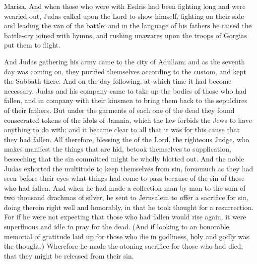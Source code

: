 { Marisa.
And when those who were with Esdris had been fighting long and were wearied out, Judas called upon the Lord to show himself, fighting on their side and leading the van of the battle;
and
{} in the language of his fathers he raised the battle-cry joined with hymns, and rushing unawares upon the troops of Gorgias put them to flight.
\par }{\PP {}And Judas gathering his army came to the city of
 Adullam; and as the seventh day was coming on, they purified themselves according to the custom, and kept the Sabbath there.
And on the day following,
 at which time it had become necessary, Judas and his company came to take up the bodies of those who had fallen,
 and in company with their kinsmen to bring them back to the sepulchres of their fathers.
But under the garments of each one of the dead they found
 consecrated tokens of the idols of Jamnia, which the law forbids the Jews to have anything to do with; and it became clear to all that it was for this cause that they had fallen.
All therefore, blessing the
{} of the Lord, the righteous Judge, who makes manifest the things that are hid,
betook themselves to supplication, beseeching that the sin committed might be wholly blotted out. And the noble Judas exhorted the multitude to keep themselves from sin, forsomuch as they had seen before their eyes what things had come to pass because of the sin of those who had fallen.
And when he had made a collection man by man to the sum of two thousand drachmas of silver, he sent to Jerusalem to offer a sacrifice for sin, doing therein right well and honorably, in that he took thought for a resurrection.
For if he were not expecting that those who had fallen would rise again, it were superfluous and idle to pray for the dead.
(And if
{} looking to an honorable memorial of gratitude laid up for those who
 die
 in godliness, holy and godly was the thought.) Wherefore he made the atoning sacrifice for those who had died, that they might be released from their sin.

}

